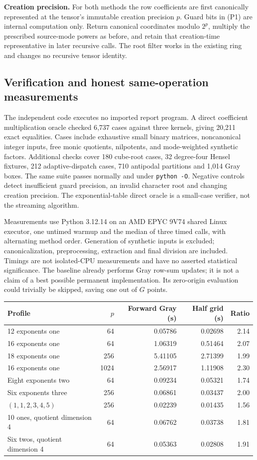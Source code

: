 \textbf{Creation precision.} For both methods the row coefficients are first
canonically represented at the tensor's immutable creation precision $p$.
Guard bits in (P1) are internal computation only. Return canonical coordinates
modulo $2^p$, multiply the prescribed source-mode powers as before, and retain
that creation-time representative in later recursive calls. The root filter
works in the existing ring and changes no recursive tensor identity.

\subsection{Verification and honest same-operation measurements}
The independent code executes no imported report program. A direct coefficient
multiplication oracle checked 6,737 cases against three kernels, giving 20,211
exact equalities. Cases include exhaustive small binary matrices, noncanonical
integer inputs, free monic quotients, nilpotents, and mode-weighted synthetic
factors. Additional checks cover 180 cube-root cases, 32 degree-four Hensel
fixtures, 212 adaptive-dispatch cases, 710 antipodal partitions and 1,014 Gray
boxes. The same suite passes normally and under \texttt{python -O}. Negative
controls detect insufficient guard precision, an invalid character root and
changing creation precision. The exponential-table direct oracle is a
small-case verifier, not the streaming algorithm.

Measurements use Python 3.12.14 on an AMD EPYC 9V74 shared Linux executor,
one untimed warmup and the median of three timed calls, with alternating method
order. Generation of synthetic inputs is excluded; canonicalization,
preprocessing, extraction and final division are included. Timings are not
isolated-CPU measurements and have no asserted statistical significance.
The baseline already performs Gray row-sum updates; it is not a claim of a
best possible permanent implementation. Its zero-origin evaluation could
trivially be skipped, saving one out of $G$ points.

\begin{center}\small
\begin{tabular}{@{}lrrrr@{}}\toprule
Profile & $p$ & Forward Gray (s) & Half grid (s) & Ratio\\\midrule
12 exponents one &64&0.05786&0.02698&2.14\\
16 exponents one &64&1.06319&0.51464&2.07\\
18 exponents one &256&5.41105&2.71399&1.99\\
16 exponents one &1024&2.56917&1.11908&2.30\\
Eight exponents two &64&0.09234&0.05321&1.74\\
Six exponents three &256&0.06861&0.03437&2.00\\
$(1,1,2,3,4,5)$ &256&0.02239&0.01435&1.56\\
10 ones, quotient dimension 4 &64&0.06762&0.03738&1.81\\
Six twos, quotient dimension 4 &64&0.05363&0.02808&1.91\\\bottomrule
\end{tabular}
\end{center}

